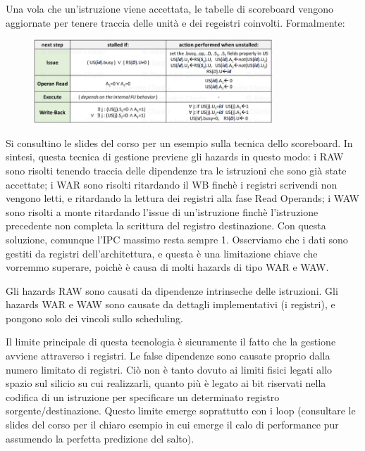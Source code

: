 \noindent Una vola che un'istruzione viene accettata, le tabelle di scoreboard vengono aggiornate per tenere traccia delle unità e dei regeistri coinvolti. Formalmente:

\begin{figure}[ht]
    \centering
    \includegraphics[width=0.8\textwidth]{fig/chapter_2/transition_rules.png}
\end{figure}

\noindent Si consultino le slides del corso per un esempio sulla tecnica dello scoreboard. In sintesi, questa tecnica di gestione previene gli hazards in questo modo: i RAW sono risolti tenendo traccia delle dipendenze tra le istruzioni che sono già state accettate; i WAR sono risolti ritardando il WB finchè i registri scrivendi non vengono letti, e ritardando la lettura dei registri alla fase Read Operands; i WAW sono risolti a monte ritardando l'issue di un'istruzione finchè l'istruzione precedente non completa la scrittura del registro destinazione. Con questa soluzione, comunque l'IPC massimo resta sempre 1. Osserviamo che i dati sono gestiti da registri dell'architettura, e questa è una limitazione chiave che vorremmo superare, poichè è causa di molti hazards di tipo WAR e WAW. 

\begin{warn}
    Gli hazards RAW sono causati da dipendenze intrinseche delle istruzioni. Gli hazards WAR e WAW sono causate da dettagli implementativi (i registri), e pongono solo dei vincoli sullo scheduling.
\end{warn}

\noindent Il limite principale di questa tecnologia è sicuramente il fatto che la gestione avviene attraverso i registri. Le false dipendenze sono causate proprio dalla numero limitato di registri. Ciò non è tanto dovuto ai limiti fisici legati allo spazio sul silicio su cui realizzarli, quanto più è legato ai bit riservati nella codifica di un istruzione per specificare un determinato registro sorgente/destinazione. 
Questo limite emerge soprattutto con i loop (consultare le slides del corso per il chiaro esempio in cui emerge il calo di performance pur assumendo la perfetta predizione del salto). 


